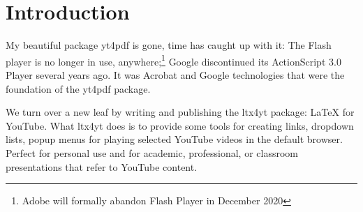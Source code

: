 \documentclass{article}
\let\pkg\textsf
\let\app\textsf
\newcommand{\YT}{\textsf{YouTube}}
\begin{document}
\maketitle

\tableofcontents
{}

\section{Introduction}\label{s:intro}

My beautiful package \pkg{yt4pdf} is gone, time has caught up with it: The
Flash player is no longer in use, anywhere;\footnote{Adobe will formally
abandon Flash Player in December 2020} \app{Google} discontinued its
ActionScript 3.0 Player several years ago. It was \app{Acrobat} and
\app{Google} technologies that were the foundation of the \pkg{yt4pdf}
package.

We turn over a new leaf by writing and publishing the \pkg{ltx4yt} package:
{\LaTeX} for \YT. What \pkg{ltx4yt} does is to provide some tools for
creating links, dropdown lists, popup menus for playing selected {\YT}
videos in the default browser. Perfect for personal use and for academic,
professional, or classroom presentations that refer to {\YT} content.


\end{document}
